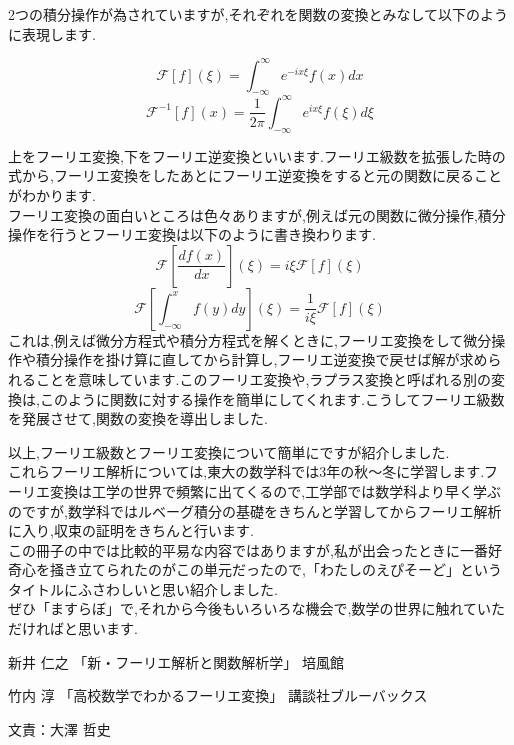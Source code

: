 2つの積分操作が為されていますが,それぞれを関数の変換とみなして以下のように表現します.

\[
  \mathcal{F}[f](\xi) = \int_{-\infty}^\infty e^{-ix\xi} f(x) dx
\]
\[
  \mathcal{F}^{-1}[f](x) = \frac{1}{2\pi} \int_{-\infty}^\infty e^{ix\xi} f(\xi) d\xi
\]

上をフーリエ変換,下をフーリエ逆変換といいます.フーリエ級数を拡張した時の式から,フーリエ変換をしたあとにフーリエ逆変換をすると元の関数に戻ることがわかります.\\
フーリエ変換の面白いところは色々ありますが,例えば元の関数に微分操作,積分操作を行うとフーリエ変換は以下のように書き換わります.\\
\[
  \mathcal{F}[\frac{df(x)}{dx}](\xi) = i\xi \mathcal{F}[f](\xi)
\]
\[
  \mathcal{F}[\int_{-\infty}^x f(y) dy](\xi) =\frac{1}{i\xi} \mathcal{F}[f](\xi)
\]
これは,例えば微分方程式や積分方程式を解くときに,フーリエ変換をして微分操作や積分操作を掛け算に直してから計算し,フーリエ逆変換で戻せば解が求められることを意味しています.このフーリエ変換や,ラプラス変換と呼ばれる別の変換は,このように関数に対する操作を簡単にしてくれます.こうしてフーリエ級数を発展させて,関数の変換を導出しました.

以上,フーリエ級数とフーリエ変換について簡単にですが紹介しました.\\
これらフーリエ解析については,東大の数学科では3年の秋〜冬に学習します.フーリエ変換は工学の世界で頻繁に出てくるので,工学部では数学科より早く学ぶのですが,数学科ではルベーグ積分の基礎をきちんと学習してからフーリエ解析に入り,収束の証明をきちんと行います.\\
この冊子の中では比較的平易な内容ではありますが,私が出会ったときに一番好奇心を掻き立てられたのがこの単元だったので,「わたしのえぴそーど」というタイトルにふさわしいと思い紹介しました.\\
ぜひ「ますらぼ」で,それから今後もいろいろな機会で,数学の世界に触れていただければと思います.
\begin{thebibliography}{9}
\item 新井 仁之 「新・フーリエ解析と関数解析学」 培風館\\
\item 竹内 淳 「高校数学でわかるフーリエ変換」 講談社ブルーバックス\\
\end{thebibliography}

文責：大澤 哲史
